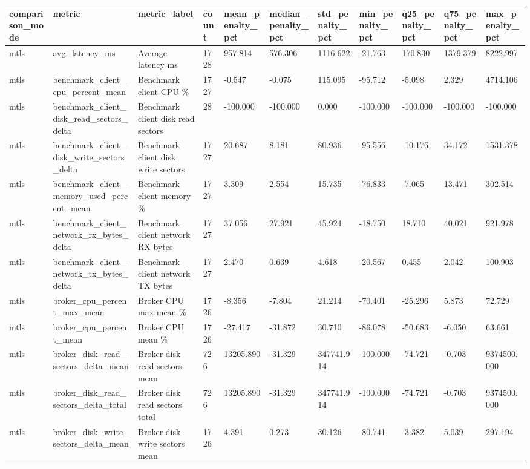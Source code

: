 \begin{longtable}{lllllllllll}
\hline
comparison\_mode & metric & metric\_label & count & mean\_penalty\_pct & median\_penalty\_pct & std\_penalty\_pct & min\_penalty\_pct & q25\_penalty\_pct & q75\_penalty\_pct & max\_penalty\_pct \\
\hline
mtls & avg\_latency\_ms & Average latency ms & 1728 & 957.814 & 576.306 & 1116.622 & -21.763 & 170.830 & 1379.379 & 8222.997 \\
mtls & benchmark\_client\_cpu\_percent\_mean & Benchmark client CPU \% & 1727 & -0.547 & -0.075 & 115.095 & -95.712 & -5.098 & 2.329 & 4714.106 \\
mtls & benchmark\_client\_disk\_read\_sectors\_delta & Benchmark client disk read sectors & 28 & -100.000 & -100.000 & 0.000 & -100.000 & -100.000 & -100.000 & -100.000 \\
mtls & benchmark\_client\_disk\_write\_sectors\_delta & Benchmark client disk write sectors & 1727 & 20.687 & 8.181 & 80.936 & -95.556 & -10.176 & 34.172 & 1531.378 \\
mtls & benchmark\_client\_memory\_used\_percent\_mean & Benchmark client memory \% & 1727 & 3.309 & 2.554 & 15.735 & -76.833 & -7.065 & 13.471 & 302.514 \\
mtls & benchmark\_client\_network\_rx\_bytes\_delta & Benchmark client network RX bytes & 1727 & 37.056 & 27.921 & 45.924 & -18.750 & 18.710 & 40.021 & 921.978 \\
mtls & benchmark\_client\_network\_tx\_bytes\_delta & Benchmark client network TX bytes & 1727 & 2.470 & 0.639 & 4.618 & -20.567 & 0.455 & 2.042 & 100.903 \\
mtls & broker\_cpu\_percent\_max\_mean & Broker CPU max mean \% & 1726 & -8.356 & -7.804 & 21.214 & -70.401 & -25.296 & 5.873 & 72.729 \\
mtls & broker\_cpu\_percent\_mean & Broker CPU mean \% & 1726 & -27.417 & -31.872 & 30.710 & -86.078 & -50.683 & -6.050 & 63.661 \\
mtls & broker\_disk\_read\_sectors\_delta\_mean & Broker disk read sectors mean & 726 & 13205.890 & -31.329 & 347741.914 & -100.000 & -74.721 & -0.703 & 9374500.000 \\
mtls & broker\_disk\_read\_sectors\_delta\_total & Broker disk read sectors total & 726 & 13205.890 & -31.329 & 347741.914 & -100.000 & -74.721 & -0.703 & 9374500.000 \\
mtls & broker\_disk\_write\_sectors\_delta\_mean & Broker disk write sectors mean & 1726 & 4.391 & 0.273 & 30.126 & -80.741 & -3.382 & 5.039 & 297.194 \\

\end{longtable}
